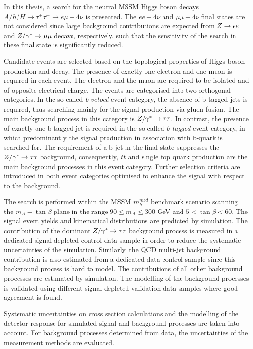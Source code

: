 In this thesis, a search for the neutral MSSM Higgs boson decays
$A/h/H \rightarrow \tau^+ \tau^- \rightarrow e \mu +4\nu$ is presented. The $ee +4\nu$ and $\mu\mu +4\nu$ final states 
are not considered since  large background contributions are expected  from $Z\rightarrow ee$ and $Z/\gamma^* \rightarrow \mu\mu$ decays,  respectively, 
such that the sensitivity of the search in these final
state is significantly reduced.

Candidate events are selected based on the topological properties of Higgs boson production
and decay. The  presence of exactly one electron and one muon is required in each event. The electron and the muon are required to be 
 isolated and of opposite electrical charge.
The  events are categorised into two orthogonal categories. In the so called  \emph{b-vetoed} event category,
the absence of b-tagged jets is required, 
thus searching mainly for the signal production via gluon fusion. The main background 
process in  this category is $Z/\gamma^*\rightarrow \tau\tau$. 
In contrast, the presence of exactly one  b-tagged jet is required in the so called \emph{b-tagged} event category, 
in which predominantly the signal production in association with b-quark is searched for. The requirement of a b-jet 
in the final state suppresses the $Z/\gamma^*\rightarrow \tau\tau$ background, consequently, $t\bar{t}$ and single top quark  production
are the main background processes in this event category. Further selection criteria are introduced in both event categories
optimised to enhance the signal with respect to the background.

The  search is performed within the MSSM $m_h^{mod}$ benchmark scenario
scanning the $m_A - \tan\beta$ plane in the range $90 \leq m_A \leq 300$ GeV and $5 < \tan\beta < 60$.
The signal event yields and kinematical distributions are predicted by simulation.
The contribution of the dominant $Z/\gamma^*\rightarrow \tau\tau$ background process is measured in a dedicated  signal-depleted control data sample
in order to reduce the systematic uncertainties of the simulation. Similarly, the QCD multi-jet background contribution 
is also estimated from a dedicated data control sample since this background process is hard to model. The
contributions of  all  other background processes  are estimated by simulation.
The modelling of the background processes is  validated using different signal-depleted validation data samples where
good agreement is found.

Systematic uncertainties  on cross section calculations and the modelling of the detector response for 
simulated signal and background processes are taken into account. For background processes  determined from  data,
the uncertainties of the measurement methods are evaluated.

